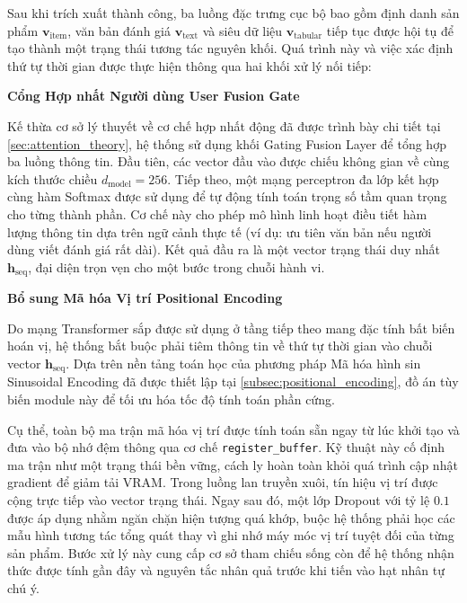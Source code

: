 Sau khi trích xuất thành công, ba luồng đặc trưng cục bộ bao gồm định danh sản phẩm $\mathbf{v}_{\text{item}}$, văn bản đánh giá $\mathbf{v}_{\text{text}}$ và siêu dữ liệu $\mathbf{v}_{\text{tabular}}$ tiếp tục được hội tụ để tạo thành một trạng thái tương tác nguyên khối. Quá trình này và việc xác định thứ tự thời gian được thực hiện thông qua hai khối xử lý nối tiếp:

\vspace{0.3cm}
\noindent \textbf{Cổng Hợp nhất Người dùng User Fusion Gate}

Kế thừa cơ sở lý thuyết về cơ chế hợp nhất động đã được trình bày chi tiết tại \ref{sec:attention_theory}, hệ thống sử dụng khối Gating Fusion Layer để tổng hợp ba luồng thông tin. Đầu tiên, các vector đầu vào được chiếu không gian về cùng kích thước chiều $d_{\text{model}} = 256$. Tiếp theo, một mạng perceptron đa lớp kết hợp cùng hàm Softmax được sử dụng để tự động tính toán trọng số tầm quan trọng cho từng thành phần. Cơ chế này cho phép mô hình linh hoạt điều tiết hàm lượng thông tin dựa trên ngữ cảnh thực tế (ví dụ: ưu tiên văn bản nếu người dùng viết đánh giá rất dài). Kết quả đầu ra là một vector trạng thái duy nhất $\mathbf{h}_{\text{seq}}$, đại diện trọn vẹn cho một bước trong chuỗi hành vi.

\vspace{0.3cm}
\noindent \textbf{Bổ sung Mã hóa Vị trí Positional Encoding}

Do mạng Transformer sắp được sử dụng ở tầng tiếp theo mang đặc tính bất biến hoán vị, hệ thống bắt buộc phải tiêm thông tin về thứ tự thời gian vào chuỗi vector $\mathbf{h}_{\text{seq}}$. Dựa trên nền tảng toán học của phương pháp Mã hóa hình sin Sinusoidal Encoding đã được thiết lập tại \ref{subsec:positional_encoding}, đồ án tùy biến module này để tối ưu hóa tốc độ tính toán phần cứng. 

Cụ thể, toàn bộ ma trận mã hóa vị trí được tính toán sẵn ngay từ lúc khởi tạo và đưa vào bộ nhớ đệm thông qua cơ chế \texttt{register\_buffer}. Kỹ thuật này cố định ma trận như một trạng thái bền vững, cách ly hoàn toàn khỏi quá trình cập nhật gradient để giảm tải VRAM. Trong luồng lan truyền xuôi, tín hiệu vị trí được cộng trực tiếp vào vector trạng thái. Ngay sau đó, một lớp Dropout với tỷ lệ $0.1$ được áp dụng nhằm ngăn chặn hiện tượng quá khớp, buộc hệ thống phải học các mẫu hình tương tác tổng quát thay vì ghi nhớ máy móc vị trí tuyệt đối của từng sản phẩm. Bước xử lý này cung cấp cơ sở tham chiếu sống còn để hệ thống nhận thức được tính gần đây và nguyên tắc nhân quả trước khi tiến vào hạt nhân tự chú ý.

